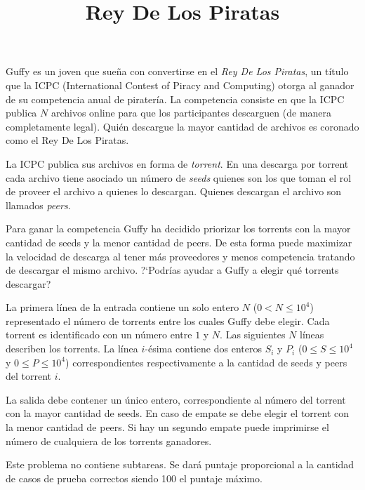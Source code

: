 \documentclass{oci}
\title{Rey De Los Piratas}
\begin{document}
\begin{problemDescription}
    Guffy es un joven que sueña con convertirse en el \emph{Rey De Los Piratas}, un título que la ICPC
    (International Contest of Piracy and Computing) otorga al ganador de su competencia anual de
    piratería.
    La competencia consiste en que la ICPC publica $N$ archivos online para que los participantes
    descarguen (de manera completamente legal).
    Quién descargue la mayor cantidad de archivos es coronado como el Rey De Los Piratas.

    La ICPC publica sus archivos en forma de \emph{torrent}.
    En una descarga por torrent cada archivo tiene asociado un número de \emph{seeds} quienes
    son los que toman el rol de proveer el archivo a quienes lo descargan.
    Quienes descargan el archivo son llamados \emph{peers}.

    Para ganar la competencia Guffy ha decidido priorizar los torrents con la mayor cantidad
    de seeds y la menor cantidad de peers.
    De esta forma puede maximizar la velocidad de descarga al tener más proveedores y menos
    competencia tratando de descargar el mismo archivo.
    ?`Podrías ayudar a Guffy a elegir qué torrents descargar?
\end{problemDescription}

\begin{inputDescription}
    La primera línea de la entrada contiene un solo entero $N$ ($0 < N \leq 10^4$)
    representado el número de torrents entre los cuales Guffy debe elegir.
    Cada torrent es identificado con un número entre $1$ y $N$.
    Las siguientes $N$ líneas describen los torrents.
    La línea $i$-ésima contiene dos enteros $S_i$ y $P_i$ ($0 \leq S \leq 10^4$ y $0 \leq P \leq 10^4$)
    correspondientes respectivamente a la cantidad de seeds y peers del torrent $i$.
\end{inputDescription}

\begin{outputDescription}
    La salida debe contener un único entero, correspondiente al número
    del torrent con la mayor cantidad de seeds.
    En caso de empate se debe elegir el torrent con la menor cantidad de peers.
    Si hay un segundo empate puede imprimirse el número de cualquiera de los torrents ganadores.
\end{outputDescription}

\begin{scoreDescription}
Este problema no contiene subtareas.
Se dará puntaje proporcional a la cantidad de casos de prueba correctos siendo 100 el puntaje máximo.
\end{scoreDescription}
\end{document}
